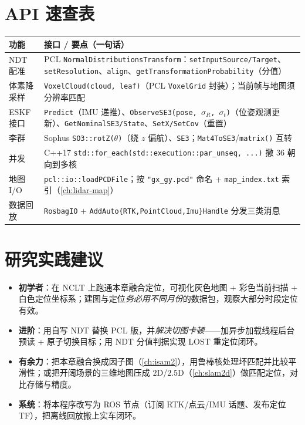 \section*{API 速查表}
\begin{table}[H]\centering\small
\begin{tabular}{p{} p{}}
\toprule
功能 & 接口 / 要点（一句话） \\
\midrule
NDT 配准 & PCL \texttt{NormalDistributionsTransform}：\texttt{setInputSource/Target}、\texttt{setResolution}、\texttt{align}、\texttt{getTransformationProbability}（分值） \\
体素降采样 & \texttt{VoxelCloud(cloud, leaf)}（PCL \texttt{VoxelGrid} 封装）；当前帧与地图须分辨率匹配 \\
ESKF 接口 & \texttt{Predict}（IMU 递推）、\texttt{ObserveSE3(pose, $\sigma_R$, $\sigma_t$)}（位姿观测更新）、\texttt{GetNominalSE3/State}、\texttt{SetX/SetCov}（重置） \\
李群 & Sophus \texttt{SO3::rotZ(}$\theta$\texttt{)}（绕 $z$ 偏航）、\texttt{SE3}；\texttt{Mat4ToSE3}/\texttt{matrix()} 互转 \\
并发 & C++17 \texttt{std::for\_each(std::execution::par\_unseq, ...)} 撒 $36$ 朝向到多核 \\
地图 I/O & \texttt{pcl::io::loadPCDFile}；按 \texttt{"gx\_gy.pcd"} 命名 + \texttt{map\_index.txt} 索引（\cref{ch:lidar-map}） \\
数据回放 & \texttt{RosbagIO} + \texttt{AddAuto\{RTK,PointCloud,Imu\}Handle} 分发三类消息 \\
\bottomrule
\end{tabular}
\end{table}

\section*{研究实践建议}
\begin{itemize}
  \item \textbf{初学者}：在 NCLT 上跑通本章融合定位，可视化灰色地图 + 彩色当前扫描 + 白色定位坐标系；建图与定位\emph{务必用不同月份}的数据包，观察大部分时段定位有效。
  \item \textbf{进阶}：用自写 NDT 替换 PCL 版，并\emph{解决切图卡顿}——加异步加载线程后台预读 + 原子切换目标；用 NDT 分值判据实现 \textsf{LOST} 重定位闭环。
  \item \textbf{有余力}：把本章融合换成因子图（\cref{ch:isam2}），用鲁棒核处理坏匹配并比较平滑性；或把开阔场景的三维地图压成 $2$D/$2.5$D（\cref{ch:slam2d}）做匹配定位，对比存储与精度。
  \item \textbf{系统}：将本程序改写为 ROS 节点（订阅 RTK/点云/IMU 话题、发布定位 TF），把离线回放搬上实车闭环。
\end{itemize}

